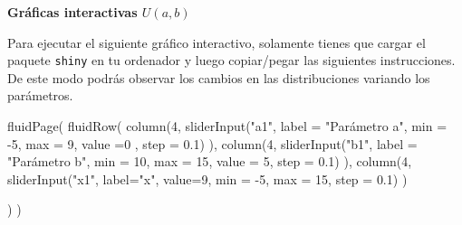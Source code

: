 \documentclass[
  letterpaper,
  DIV=11,
  numbers=noendperiod]{scrreprt}
\newenvironment{Shaded}{\begin{snugshade}}{\end{snugshade}}
\newcommand{\AttributeTok}[1]{\textcolor[rgb]{0.40,0.45,0.13}{#1}}
\newcommand{\DecValTok}[1]{\textcolor[rgb]{0.68,0.00,0.00}{#1}}
\newcommand{\FloatTok}[1]{\textcolor[rgb]{0.68,0.00,0.00}{#1}}
\newcommand{\FunctionTok}[1]{\textcolor[rgb]{0.28,0.35,0.67}{#1}}
\newcommand{\NormalTok}[1]{\textcolor[rgb]{0.00,0.23,0.31}{#1}}
\newcommand{\SpecialCharTok}[1]{\textcolor[rgb]{0.37,0.37,0.37}{#1}}
\newcommand{\StringTok}[1]{\textcolor[rgb]{0.13,0.47,0.30}{#1}}
\begin{document}
\textbf{Gráficas interactivas \(U(a,b)\)}

Para ejecutar el siguiente gráfico interactivo, solamente tienes que
cargar el paquete \texttt{shiny} en tu ordenador y luego copiar/pegar
las siguientes instrucciones. De este modo podrás observar los cambios
en las distribuciones variando los parámetros.

\begin{Shaded}
\begin{Highlighting}[]
\FunctionTok{fluidPage}\NormalTok{(}
\FunctionTok{fluidRow}\NormalTok{(}
  \FunctionTok{column}\NormalTok{(}\DecValTok{4}\NormalTok{,}
         \FunctionTok{sliderInput}\NormalTok{(}\StringTok{"a1"}\NormalTok{, }\AttributeTok{label =} \StringTok{"Parámetro a"}\NormalTok{,}
              \AttributeTok{min =} \SpecialCharTok{{-}}\DecValTok{5}\NormalTok{, }\AttributeTok{max =} \DecValTok{9}\NormalTok{, }\AttributeTok{value =}\DecValTok{0}\NormalTok{ , }\AttributeTok{step =} \FloatTok{0.1}\NormalTok{)}
\NormalTok{         ),}
  \FunctionTok{column}\NormalTok{(}\DecValTok{4}\NormalTok{,}
          \FunctionTok{sliderInput}\NormalTok{(}\StringTok{"b1"}\NormalTok{, }\AttributeTok{label =} \StringTok{"Parámetro b"}\NormalTok{,}
                     \AttributeTok{min =} \DecValTok{10}\NormalTok{, }\AttributeTok{max =} \DecValTok{15}\NormalTok{, }\AttributeTok{value =} \DecValTok{5}\NormalTok{, }\AttributeTok{step =} \FloatTok{0.1}\NormalTok{)}
\NormalTok{         ),}
  \FunctionTok{column}\NormalTok{(}\DecValTok{4}\NormalTok{,}
         \FunctionTok{sliderInput}\NormalTok{(}\StringTok{"x1"}\NormalTok{, }\AttributeTok{label=}\StringTok{"x"}\NormalTok{, }\AttributeTok{value=}\DecValTok{9}\NormalTok{, }\AttributeTok{min =} \SpecialCharTok{{-}}\DecValTok{5}\NormalTok{, }\AttributeTok{max =} \DecValTok{15}\NormalTok{, }\AttributeTok{step =} \FloatTok{0.1}\NormalTok{)}
\NormalTok{         )}
  
\NormalTok{)}
\NormalTok{)}


\end{Highlighting}
\end{Shaded}
\end{document}
